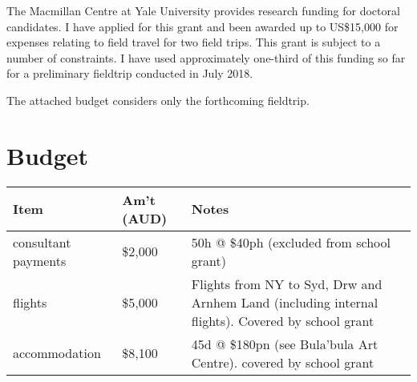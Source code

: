 \documentclass[12pt]{article}
\begin{document}
The Macmillan Centre at Yale University provides research funding for doctoral candidates. I have applied for this grant and been awarded up to US\$15,000 for expenses relating to field travel for two field trips. This grant is subject to a number of constraints. I have used approximately one-third of this funding so far for a preliminary fieldtrip conducted in July 2018.

The attached budget considers only the forthcoming fieldtrip.


\section*{Budget}

\begin{tabular}{l|l|p{}}\toprule
Item&Am't (AUD)&Notes\\\midrule
consultant payments&\$2,000 &50h @ \$40ph (excluded from school grant)\\
flights&\$5,000 &Flights from NY to Syd, Drw and Arnhem Land (including internal flights). Covered by school grant\\
accommodation&\$8,100 &45d @ \$180pn (see Bula'bula Art Centre). covered by school grant\\\bottomrule
	
\end{tabular}
\end{document}
